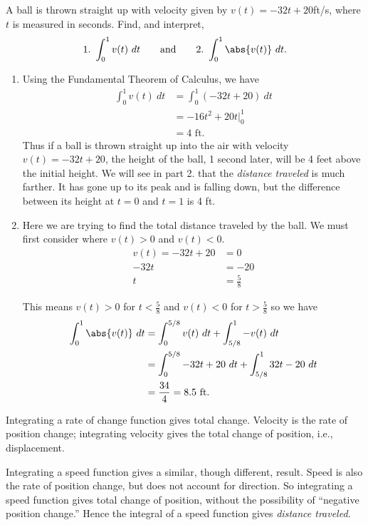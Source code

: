 \begin{example}\label{ex_ftcmotion1}
A ball is thrown straight up with velocity given by $v(t) = -32t+20$ft/s, where $t$ is measured in seconds. Find, and interpret,
\[1.\ \int_0^1 v(t)\ dt\qquad\text{and}\qquad 2.\ \int_0^1\abs{v(t)}\ dt.\]
\solution
\begin{enumerate}
\item Using the Fundamental Theorem of Calculus, we have 
\begin{align*}
	\int_0^1 v(t)\ dt &= \int_0^1 (-32t+20)\ dt \\
	&= -16t^2 + 20t\Big|_0^1 \\
	&= 4\text{ ft}.
\end{align*}
Thus if a ball is thrown straight up into the air with velocity $v(t) = -32t+20$, the height of the ball, 1 second later, will be 4 feet above the initial height. We will see in part 2. that the \emph{distance traveled} is much farther. It has gone up to its peak and is falling down, but the difference between its height at $t=0$ and $t=1$ is 4 ft.

\item Here we are trying to find the total distance traveled by the ball. We must first consider where $v(t)>0$ and $v(t)<0$.  
\begin{align*}
v(t)=-32t+20&=0\\
-32t&=-20\\
t&=\frac{5}{8}
\end{align*}

This means $v(t)>0$ for $t<\frac{5}{8}$ and $v(t)<0$ for $t>\frac{5}{8}$ so we have 
\begin{align*}
\int_0^1 \abs{v(t)}\ dt
&=\int_0^{5/8} v(t)\ dt + \int_{5/8}^1 -v(t)\ dt\\
&=\int_0^{5/8} -32t+20\ dt + \int_{5/8}^1 32t-20\ dt\\
&=\frac{34}{4}=8.5 \text{ ft}.
\end{align*}
\end{enumerate}
\end{example}

Integrating a rate of change function gives total change. Velocity is the rate of position change; integrating velocity gives the total change of position, i.e., displacement.

Integrating a speed function gives a similar, though different, result. Speed is also the rate of position change, but does not account for direction. So integrating a speed function gives total change of position, without the possibility of ``negative position change.'' Hence the integral of a speed function gives \emph{distance traveled.}

